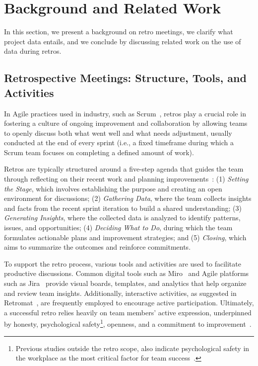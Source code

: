 \section{Background and Related Work}
\label{sec_background}

In this section, we present a background on retro meetings, we clarify what project data entails, and we conclude by discussing related work on the use of data during retros.


\subsection{Retrospective Meetings: Structure, Tools, and Activities}
\label{sec_background_retro}

In Agile practices used in industry, such as Scrum~\cite{scrum, scrum_alliance},  retros play a crucial role in fostering a culture of ongoing improvement and collaboration by allowing teams to openly discuss both what went well and what needs adjustment, usually conducted at the end of every sprint (i.e., a fixed timeframe during which a Scrum team focuses on completing a defined amount of work).

Retros are typically structured around a five-step agenda that guides the team through reflecting on their recent work and planning improvements~\cite{derby_agile_2006}: (1) \textit{Setting the Stage}, which involves establishing the purpose and creating an open environment for discussions; (2) \textit{Gathering Data}, where the team collects insights and facts from the recent sprint iteration to build a shared understanding; (3) \textit{Generating Insights}, where the collected data is analyzed to identify patterns, issues, and opportunities; (4) \textit{Deciding What to Do}, during which the team formulates actionable plans and improvement strategies; and (5) \textit{Closing}, which aims to summarize the outcomes and reinforce commitments. 

To support the retro process, various tools and activities are used to facilitate productive discussions. Common digital tools such as Miro~\cite{miro} and Agile platforms such as Jira~\cite{jira} provide visual boards, templates, and analytics that help organize and review team insights. Additionally, interactive activities, as suggested in Retromat~\cite{retromat}, are frequently employed to encourage active participation. Ultimately, a successful retro relies heavily on team members’ active expression, underpinned by honesty, psychological safety\footnote{Previous studies outside the retro scope, also indicate psychological safety in the workplace as the most critical factor for team success~\cite{mccausland_creating_2023,nyt_online}.}, openness, and a commitment to improvement~\cite{manager_21_2021}.


